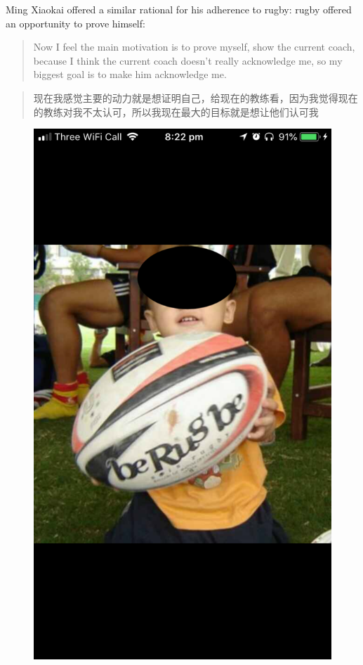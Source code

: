 \begin{CJK}{UTF8}{gbsn}
Ming Xiaokai offered a similar rational for his adherence to rugby: rugby offered an opportunity to prove himself:

  \begin{quote}
    Now I feel the main motivation is to prove myself, show the current coach, because I think the current coach doesn't really acknowledge me, so my biggest goal is to make him acknowledge me.
  \end{quote}

  \begin{quote}
    现在我感觉主要的动力就是想证明自己，给现在的教练看，因为我觉得现在的教练对我不太认可，所以我现在最大的目标就是想让他们认可我
  \end{quote}


  \begin{figure}[htbp]
    \begin{center}
      \includegraphics[scale =.2]{images/bjmWeChatProfile1.png}

\end{center}
\end{figure}
\end{CJK}
